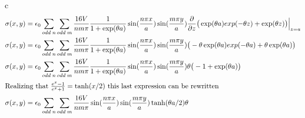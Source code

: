 \begin{homeworkProblem}[Jackson ed. 3: 2.23)]
\begin{homeworkSection}{c}
\begin{align}
\sigma(x,y) &= \epsilon_0 \sum\limits_{odd\;n} \sum\limits_{odd\;m} \frac{16 V}{n m \pi} \frac{1}{1+\exp(\theta a)} \sin(\frac{n \pi x}{a}) \sin(\frac{m \pi y}{a}) \dfrac{\partial }{\partial z}\big(\exp(\theta a)exp(-\theta z) + \exp(\theta z)\big)\Big|_{z=a} \nonumber \\
\sigma(x,y) &= \epsilon_0 \sum\limits_{odd\;n} \sum\limits_{odd\;m} \frac{16 V}{n m \pi} \frac{1}{1+\exp(\theta a)} \sin(\frac{n \pi x}{a}) \sin(\frac{m \pi y}{a}) \big(-\theta \exp(\theta a)exp(-\theta a) + \theta \exp(\theta a)\big) \nonumber \\
\sigma(x,y) &= \epsilon_0 \sum\limits_{odd\;n} \sum\limits_{odd\;m} \frac{16 V}{n m \pi} \frac{1}{1+\exp(\theta a)} \sin(\frac{n \pi x}{a}) \sin(\frac{m \pi y}{a}) \theta\big(-1 + \exp(\theta a)\big) \nonumber \\
\intertext{Realizing that $\frac{e^x-1}{e^x+1} = \tanh(x/2)$ this last expression can be rewritten} \nonumber
\sigma(x,y) &= \epsilon_0 \sum\limits_{odd\;n} \sum\limits_{odd\;m} \frac{16 V}{n m \pi} \sin(\frac{n \pi x}{a}) \sin(\frac{m \pi y}{a})\tanh(\theta a/2) \theta \nonumber
\end{align}
\end{homeworkSection}

\end{homeworkProblem}
